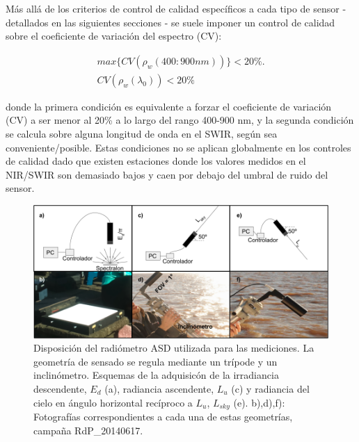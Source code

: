     
    Más allá de los criterios de control de calidad específicos a cada tipo de sensor - detallados en las siguientes secciones - se suele imponer un control de calidad sobre el coeficiente de variación del espectro (CV):

    \begin{equation}
    \begin{aligned}
        max\{CV(\rho_{w}(400:900 nm))\} < 20 \%.\\
        CV(\rho_{w}(\lambda_{0})) < 20\%
    \end{aligned}    
    \label{dat:eq:CV}
    \end{equation}
    
    \noindent donde la primera condición es equivalente a forzar el coeficiente de variación (CV) a ser menor al 20\% a lo largo del rango 400-900 nm, y la segunda condición se calcula sobre alguna longitud de onda en el SWIR, según sea conveniente/posible. Estas condiciones no se aplican globalmente en los controles de calidad dado que existen estaciones donde los valores medidos en el NIR/SWIR son demasiado bajos y caen por debajo del umbral de ruido del sensor.
    
    
    \begin{figure}
    \centering
    \includegraphics[width=\textwidth]{dat/figures/ASD.png}
    \caption[Disposición del radiómetro ASD utilizada para las mediciones.]{Disposición del radiómetro ASD utilizada para las mediciones. La geometría de sensado se regula mediante un trípode y un inclinómetro. Esquemas de la adquisicón de la irradiancia descendente, $E_{d}$ (a), radiancia ascendente, $L_{u}$ (c) y radiancia del cielo en ángulo horizontal recíproco a $L_{u}$, $L_{sky}$ (e). b),d),f): Fotografías correspondientes a cada una de estas geometrías, campaña RdP\_20140617.}
    \label{dat:ASD}
    \end{figure}

